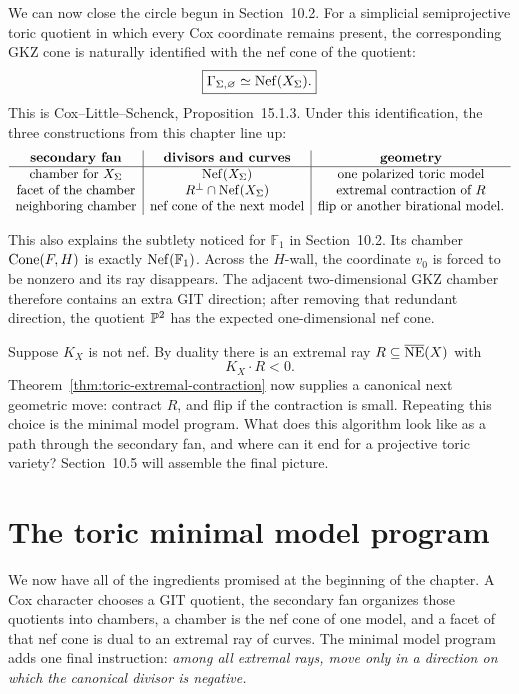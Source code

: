 We can now close the circle begun in Section~10.2.  For a simplicial
semiprojective toric quotient in which every Cox coordinate remains
present, the corresponding GKZ cone is naturally identified with the
nef cone of the quotient:
\[
\boxed{
\Gamma_{\Sigma,\varnothing}
\simeq
\operatorname{Nef}(X_\Sigma).}
\]
This is Cox--Little--Schenck, Proposition~15.1.3.  Under this
identification, the three constructions from this chapter line up:
\[
\begin{array}{c|c|c}
\textbf{secondary fan}
&\textbf{divisors and curves}
&\textbf{geometry}
\\
\hline
\text{chamber for }X_\Sigma
&\operatorname{Nef}(X_\Sigma)
&\text{one polarized toric model}
\\
\text{facet of the chamber}
&R^\perp\cap\operatorname{Nef}(X_\Sigma)
&\text{extremal contraction of }R
\\
\text{neighboring chamber}
&\text{nef cone of the next model}
&\text{flip or another birational model.}
\end{array}
\]

This also explains the subtlety noticed for \(\mathbb F_1\) in
Section~10.2.  Its chamber \(\operatorname{Cone}(F,H)\) is exactly
\(\operatorname{Nef}(\mathbb F_1)\).  Across the \(H\)-wall, the coordinate \(v_0\)
is forced to be nonzero and its ray disappears.  The adjacent
two-dimensional GKZ chamber therefore contains an extra GIT direction;
after removing that redundant direction, the quotient \(\mathbb{P}^2\) has
the expected one-dimensional nef cone.

\begin{pauseandthink}
Suppose \(K_X\) is not nef.  By duality there is an extremal ray
\(R\subseteq\overline{\operatorname{NE}}(X)\) with
\[
K_X\cdot R<0.
\]
Theorem~\ref{thm:toric-extremal-contraction} now supplies a canonical
next geometric move: contract \(R\), and flip if the contraction is
small.  Repeating this choice is the minimal model program.  What does
this algorithm look like as a path through the secondary fan, and
where can it end for a projective toric variety?  Section~10.5 will
assemble the final picture.
\end{pauseandthink}

\section{The toric minimal model program}
\label{sec:toric-mmp}

We now have all of the ingredients promised at the beginning of the
chapter.  A Cox character chooses a GIT quotient, the secondary fan
organizes those quotients into chambers, a chamber is the nef cone of
one model, and a facet of that nef cone is dual to an extremal ray of
curves.  The minimal model program adds one final instruction:
\emph{among all extremal rays, move only in a direction on which the
canonical divisor is negative.}

